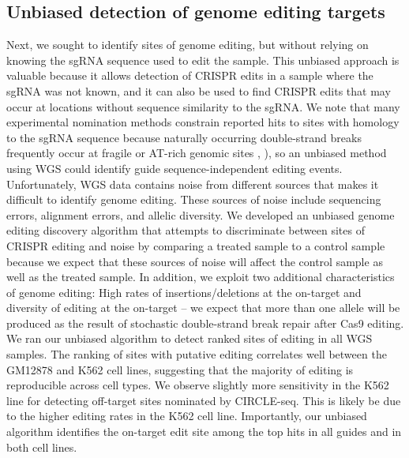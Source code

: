 \documentclass[a4paper, titlepage, openright]{book}
\begin{document}
\subsection{Unbiased detection of genome editing targets}
Next, we sought to identify sites of genome editing, but without relying on knowing the sgRNA sequence used to edit the sample. This unbiased approach is valuable because it allows detection of CRISPR edits in a sample where the sgRNA was not known, and it can also be used to find CRISPR edits that may occur at locations without sequence similarity to the sgRNA. We note that many experimental nomination methods constrain reported hits to sites with homology to the sgRNA sequence because naturally occurring double-strand breaks frequently occur at fragile or AT-rich genomic sites \citep{nobles2019iguide}, ), so an unbiased method using WGS could identify guide sequence-independent editing events.  Unfortunately, WGS data contains noise from different sources that makes it difficult to identify genome editing. These sources of noise include sequencing errors, alignment errors, and allelic diversity. We developed an unbiased genome editing discovery algorithm that attempts to discriminate between sites of CRISPR editing and noise by comparing a treated sample to a control sample because we expect that these sources of noise will affect the control sample as well as the treated sample. In addition, we exploit two additional characteristics of genome editing: High rates of insertions/deletions at the on-target and diversity of editing at the on-target – we expect that more than one allele will be produced as the result of stochastic double-strand break repair after Cas9 editing. We ran our unbiased algorithm to detect ranked sites of editing in all WGS samples. The ranking of sites with putative editing correlates well between the GM12878 and K562 cell lines, suggesting that the majority of editing is reproducible across cell types. We observe slightly more sensitivity in the K562 line for detecting off-target sites nominated by CIRCLE-seq. This is likely be due to the higher editing rates in the K562 cell line. Importantly, our unbiased algorithm identifies the on-target edit site among the top hits in all guides and in both cell lines.
\end{document}
